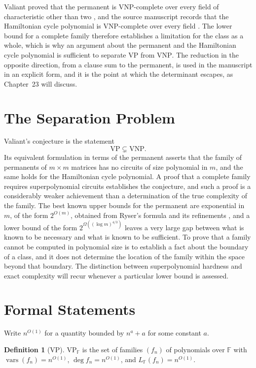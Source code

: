 \documentclass[11pt,letterpaper]{report}
\theoremstyle{plain}
\theoremstyle{definition}
\newtheorem{definition}[theorem]{Definition}
\theoremstyle{remark}
\newcommand{\VP}{\mathrm{VP}}
\newcommand{\VNP}{\mathrm{VNP}}
\begin{document}
Valiant proved that the permanent is $\VNP$-complete over every field of characteristic other than two \cite{Valiant1979}, and the source manuscript records that the Hamiltonian cycle polynomial is $\VNP$-complete over every field \cite{Source2026}. The lower bound for a complete family therefore establishes a limitation for the class as a whole, which is why an argument about the permanent and the Hamiltonian cycle polynomial is sufficient to separate $\VP$ from $\VNP$. The reduction in the opposite direction, from a clause sum to the permanent, is used in the manuscript in an explicit form, and it is the point at which the determinant escapes, as Chapter~23 will discuss.

\section{The Separation Problem}

Valiant's conjecture is the statement
\[
\VP\subsetneq\VNP.
\]
Its equivalent formulation in terms of the permanent asserts that the family of permanents of $m\times m$ matrices has no circuits of size polynomial in $m$, and the same holds for the Hamiltonian cycle polynomial. A proof that a complete family requires superpolynomial circuits establishes the conjecture, and such a proof is a considerably weaker achievement than a determination of the true complexity of the family. The best known upper bounds for the permanent are exponential in $m$, of the form $2^{O(m)}$, obtained from Ryser's formula and its refinements \cite{Ryser1963,Glynn2010}, and a lower bound of the form $2^{\Omega((\log m)^{4/3})}$ leaves a very large gap between what is known to be necessary and what is known to be sufficient. To prove that a family cannot be computed in polynomial size is to establish a fact about the boundary of a class, and it does not determine the location of the family within the space beyond that boundary. The distinction between superpolynomial hardness and exact complexity will recur whenever a particular lower bound is assessed.

\section{Formal Statements}

Write $n^{O(1)}$ for a quantity bounded by $n^a+a$ for some constant $a$.

\begin{definition}[VP]
$\VP_{\mathbb F}$ is the set of families $(f_n)$ of polynomials over $\mathbb F$ with $\operatorname{vars}(f_n)=n^{O(1)}$, $\deg f_n=n^{O(1)}$, and $L_{\mathbb F}(f_n)=n^{O(1)}$.
\end{definition}
\end{document}
